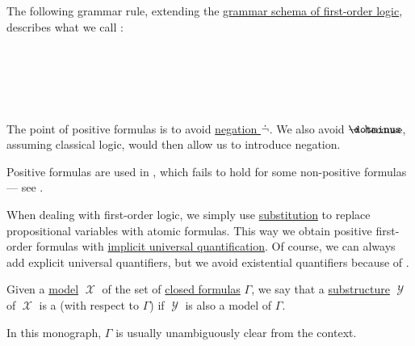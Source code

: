 \begin{definition}\label{def:positive_formula}
  The following grammar rule, extending the \hyperref[def:first_order_syntax/grammar_schema]{grammar schema of first-order logic}, describes what we call :
  \begin{bnf*}
     {\bnftsq{\( \syntop \)} \bnfor} \\
     \\
     \\
     \\
  \end{bnf*}
\end{definition}
\begin{comments}
  \item The point of positive formulas is to avoid \hyperref[def:propositional_alphabet/negation]{negation \( \dot\neg \)}. We also avoid \( \synimplies \) because, assuming classical logic,  would then allow us to introduce negation.

  \item Positive formulas are used in , which fails to hold for some non-positive formulas --- see .

  \item When dealing with first-order logic, we simply use \hyperref[thm:first_order_substitution_equivalence/propositional]{substitution} to replace propositional variables with atomic formulas. This way we obtain positive first-order formulas with \hyperref[thm:implicit_universal_quantification]{implicit universal quantification}. Of course, we can always add explicit universal quantifiers, but we avoid existential quantifiers because of .
\end{comments}

\begin{definition}\label{def:first_order_submodel}
  Given a \hyperref[def:first_order_model]{model} \( \mscrX \) of the set of \hyperref[def:first_order_syntax/closed_formula]{closed formulas} \( \Gamma \), we say that a \hyperref[def:first_order_substructure]{substructure} \( \mscrY \) of \( \mscrX \) is a  (with respect to \( \Gamma \)) if \( \mscrY \) is also a model of \( \Gamma \).
\end{definition}
\begin{comments}
  \item In this monograph, \( \Gamma \) is usually unambiguously clear from the context.
\end{comments}


